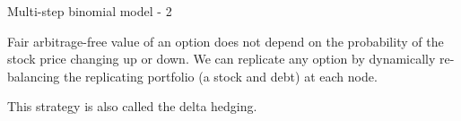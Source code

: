 \documentclass{beamer}
\begin{document}
\begin{frame}{Multi-step binomial model - 2}
\centering
{}

\justify
Fair arbitrage-free value of an option does not depend on the probability of the stock price changing up or down. We can replicate any option by \alert{dynamically} re-balancing the replicating portfolio (a stock and debt) at each node.

\justify
This strategy is also called the \alert{delta hedging}.
\end{frame}



\newcommand{\highlightStockLink}[6]{
	\draw[
		color=#4,
		very thick,
		->,
		>=triangle 45
	]
	(#1.east) -- (#2.west)
	node[
		pos=#5,
		anchor=#6
	]
	{#3};
}

\newcommand{\highlightStockLinkUp}[3]{
	\highlightStockLink{#1}{#2}{$q$}{#3}{0.5}{south}
}
\end{document}
